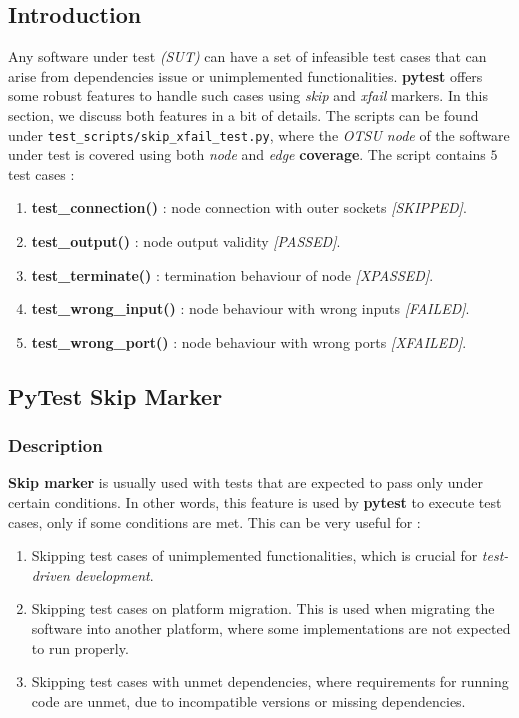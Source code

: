 \subsection{Introduction}
Any software under test \emph{(SUT)} can have a set of infeasible test cases that can arise from dependencies issue or unimplemented functionalities. \textbf{pytest} offers some robust features to handle such cases using \emph{skip} and \emph{xfail} markers. In this section, we discuss both features in a bit of details. The scripts can be found under \texttt{test\_scripts/skip\_xfail\_test.py}, where the \emph{OTSU node} of the software under test is covered using both \emph{node} and \emph{edge} \textbf{coverage}. The script contains $5$ test cases :
\begin{enumerate}
    \item \textbf{test\_connection()} : node connection with outer sockets \emph{[SKIPPED]}.
    \item \textbf{test\_output()} : node output validity \emph{[PASSED]}.
    \item \textbf{test\_terminate()} : termination behaviour of node \emph{[XPASSED]}.
    \item \textbf{test\_wrong\_input()} : node behaviour with wrong inputs \emph{[FAILED]}.
    \item \textbf{test\_wrong\_port()} : node behaviour with wrong ports \emph{[XFAILED]}.
\end{enumerate}

\subsection{PyTest Skip Marker}

\subsubsection{Description}
\textbf{Skip marker} is usually used with tests that are expected to pass only under certain conditions. In other words, this feature is used by \textbf{pytest} to execute test cases, only if some conditions are met. This can be very useful for :
\begin{enumerate}
    \item Skipping test cases of unimplemented functionalities, which is crucial for \emph{test-driven development}.
    \item Skipping test cases on platform migration. This is used when migrating the software into another platform, where some implementations are not expected to run properly.
    \item Skipping test cases with unmet dependencies, where requirements for running code are unmet, due to incompatible versions or missing dependencies.
\end{enumerate}

